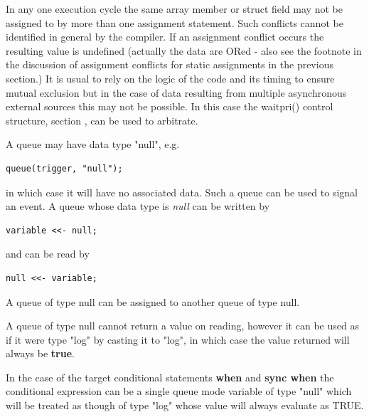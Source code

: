             In any one execution cycle the same array member or struct field may
            not be assigned to by more than one assignment statement. Such
            conflicts cannot be identified in general by the compiler. If an
            assignment conflict occurs the resulting value is undefined
            (actually the data are ORed - also see the footnote in the
            discussion of assignment conflicts for static assignments in the
            previous section.) It is usual to rely on the logic of the code and
            its timing to ensure mutual exclusion but in the case of data
            resulting from multiple asynchronous external sources this may not
            be possible. In this case the waitpri() control structure, section
            , can be used to arbitrate.

            A queue may have data type "null", e.g.
            \begin{lstlisting}[gobble=12, language=threepl]
                   queue(trigger, "null");
            \end{lstlisting}
            in which case it will have no
            associated data. Such a queue can be used to signal an event.
            A queue whose data type is {\em null} can be written by
            \begin{lstlisting}[gobble=12, language=threepl]
                   variable <<- null;
            \end{lstlisting}
            and can be read by
            \begin{lstlisting}[gobble=12, language=threepl]
                   null <<- variable;
            \end{lstlisting}
            
            A queue of type null can be assigned to another queue of type null.
            
            A queue of type null cannot return a value on reading, however
            it can be used as if it were type "log" by casting it to
            "log", in which case the value returned will always be {\bf true}.
            
            In the case of the target conditional statements {\bf when} and
            {\bf sync when} the conditional expression can be a single queue
            mode variable of type "null" which will be treated as though of
            type "log" whose value will always evaluate as TRUE.            
            
